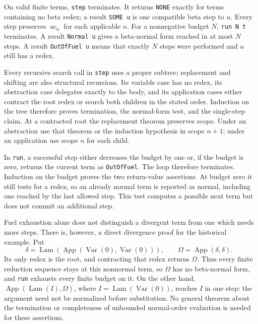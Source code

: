 \begin{proposition}
\label{prop:debruijn_step_fuel}
On valid finite terms, \texttt{step} terminates. It returns
\texttt{NONE} exactly for terms containing no beta redex; a result
\texttt{SOME u} is one compatible beta step to $u$. Every step
preserves $\operatorname{sc}_n$ for each applicable $n$.
For a nonnegative budget $N$, \texttt{run N t} terminates. A result
\texttt{Normal u} gives a beta-normal form reached in at most $N$
steps. A result \texttt{OutOfFuel u} means that exactly $N$ steps
were performed and $u$ still has a redex.
\end{proposition}
\Proof
Every recursive search call in \texttt{step} uses a proper subtree;
replacement and shifting are also structural recursions. Its variable
case has no redex, its abstraction case delegates exactly to the body,
and its application cases either contract the root redex or search
both children in the stated order. Induction on the tree therefore
proves termination, the normal-form test, and the single-step claim.
At a contracted root the replacement theorem preserves scope. Under
an abstraction use that theorem or the induction hypothesis in scope
$n+1$; under an application use scope $n$ for each child.

In \texttt{run}, a successful step either decreases the budget by one
or, if the budget is zero, returns the current term as
\texttt{OutOfFuel}. The loop therefore terminates. Induction on the
budget proves the two return-value assertions. At budget zero it
still tests for a redex, so an already normal term is reported as
normal, including one reached by the last allowed step. This test
computes a possible next term but does not commit an additional step.
\Done

Fuel exhaustion alone does not distinguish a divergent term from one
which needs more steps. There is, however, a direct divergence proof
for the historical example. Put
\[
\delta=\operatorname{Lam}(\operatorname{App}(\operatorname{Var}(0),
                                            \operatorname{Var}(0))),
\qquad \Omega=\operatorname{App}(\delta,\delta).
\]
Its only redex is the root, and contracting that redex returns
$\Omega$. Thus every finite reduction sequence stays at this nonnormal
term, so $\Omega$ has no beta-normal form, and \texttt{run} exhausts
every finite budget on it. On the other hand,
$\operatorname{App}(\operatorname{Lam}(I),\Omega)$, where
$I=\operatorname{Lam}(\operatorname{Var}(0))$, reaches $I$ in one
step: the argument need not be normalized before substitution.
No general theorem about the termination or completeness of unbounded
normal-order evaluation is needed for these assertions.

